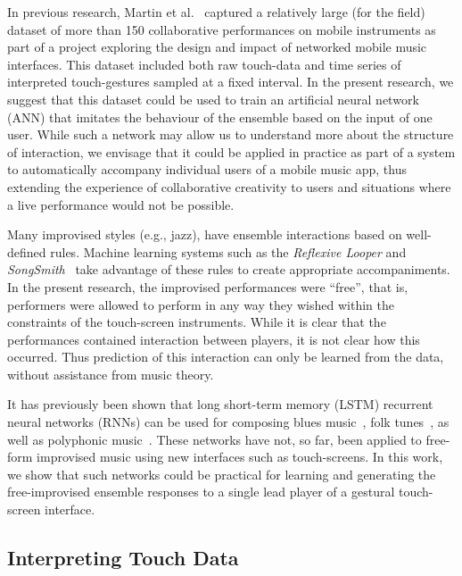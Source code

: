 \documentclass{article}
\begin{document}
In previous research, Martin et al.~\cite{Martin:2016rm} captured a
relatively large (for the field) dataset of more than 150
collaborative performances on mobile instruments as part of a project
exploring the design and impact of networked mobile music interfaces.
This dataset included both raw touch-data and time series of
interpreted touch-gestures sampled at a fixed interval. In the present
research, we suggest that this dataset could be used to train an
artificial neural network (ANN) that imitates the behaviour of the
ensemble based on the input of one user. While such a network may
allow us to understand more about the structure of interaction, we
envisage that it could be applied in practice as part of a system to
automatically accompany individual users of a mobile music app, thus
extending the experience of collaborative creativity to users and
situations where a live performance would not be possible.

Many improvised styles (e.g., jazz), have ensemble interactions based
on well-defined rules. Machine learning systems such as the
\emph{Reflexive Looper}\cite{Pachet:2013kq} and
\emph{SongSmith}~\cite{Morris:2008qe} take advantage of these rules to
create appropriate accompaniments. In the present research, the
improvised performances were ``free'', that is, performers were
allowed to perform in any way they wished within the constraints of
the touch-screen instruments. While it is clear that the performances
contained interaction between players, it is not clear how this
occurred. Thus prediction of this interaction can only be learned from
the data, without assistance from music theory.

It has previously been shown that long short-term memory (LSTM)
recurrent neural networks (RNNs) can be used for composing blues
music~\cite{Eck:2007rw}, folk tunes~\cite{Sturm:2016rz}, as well as
polyphonic music~\cite{Walder:2016le}. These networks have not, so
far, been applied to free-form improvised music using new interfaces
such as touch-screens. In this work, we show that such networks could
be practical for learning and generating the free-improvised ensemble
responses to a single lead player of a gestural touch-screen
interface.

\subsection{Interpreting Touch Data}
\end{document}

